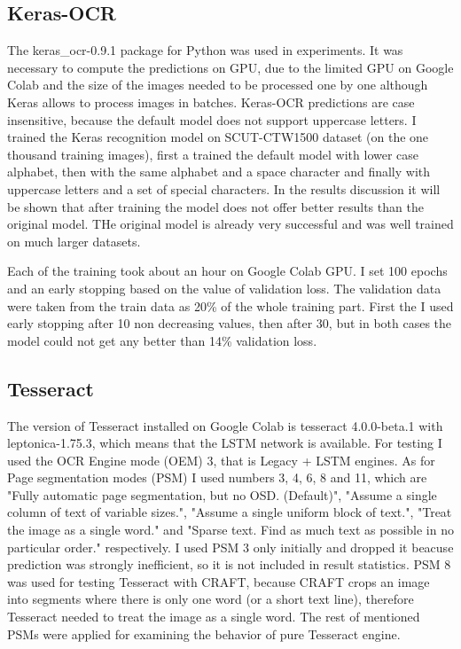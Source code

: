 \subsection*{Keras-OCR}
The keras\_ocr-0.9.1 package for Python was used in experiments. It was necessary to compute the predictions on GPU, due to the limited GPU on Google Colab and the size of the images needed to be processed one by one although Keras allows to process images in batches. Keras-OCR predictions are case insensitive, because the default model does not support uppercase letters. I trained the Keras recognition model on SCUT-CTW1500 dataset (on the one thousand training images), first a trained the default model with lower case alphabet, then with the same alphabet and a space character and finally with uppercase letters and a set of special characters. In the results discussion it will be shown that after training the model does not offer better results than the original model. THe original model is already very successful and was well trained on much larger datasets.

Each of the training took about an hour on Google Colab GPU. I set 100 epochs and an early stopping based on the value of validation loss. The validation data were taken from the train data as 20\% of the whole training part. First the I used early stopping after 10 non decreasing values, then after 30, but in both cases the model could not get any better than 14\% validation loss.


\subsection*{Tesseract}
The version of Tesseract installed on Google Colab is tesseract 4.0.0-beta.1 with leptonica-1.75.3, which means that the LSTM network is available. For testing I used the OCR Engine mode (OEM) 3, that is Legacy + LSTM engines. As for Page segmentation modes (PSM) I used numbers 3, 4, 6, 8 and 11, which are "Fully automatic page segmentation, but no OSD. (Default)", "Assume a single column of text of variable sizes.",  "Assume a single uniform block of text.",  "Treat the image as a single word." and "Sparse text. Find as much text as possible in no particular order." respectively. I used PSM 3 only initially and dropped it beacuse prediction was strongly inefficient, so it is not included in result statistics. PSM 8 was used for testing Tesseract with CRAFT, because CRAFT crops an image into segments where there is only one word (or a short text line), therefore Tesseract needed to treat the image as a single word. The rest of mentioned PSMs were applied for examining the behavior of pure Tesseract engine. 




